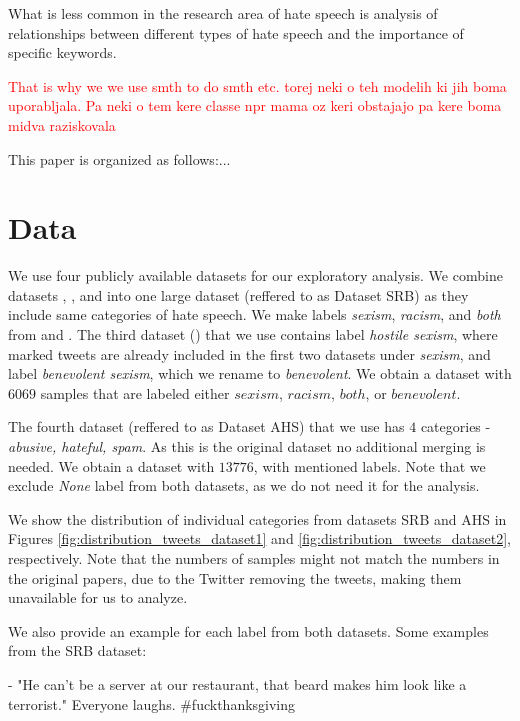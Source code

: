 \documentclass[fleqn,moreauthors,10pt]{ds_report}
\begin{document}
What is less common in the research area of hate speech is analysis of relationships between different types of hate speech and the importance of specific keywords.

\textcolor{red}{That is why we we use smth to do smth etc. torej neki o teh modelih ki jih boma uporabljala. Pa neki o tem kere classe npr mama oz keri obstajajo pa kere boma midva raziskovala}

This paper is organized as follows:...

\section*{Data}

We use four publicly available datasets for our exploratory analysis. We combine datasets \cite{waseem2016you}, \cite{rizoiu2019transfer}, and \cite{jha2017does} into one large dataset (reffered to as Dataset SRB) as they include same categories of hate speech. We make labels \textit{sexism}, \textit{racism}, and \textit{both} from \cite{waseem2016you} and \cite{rizoiu2019transfer}. The third dataset (\cite{jha2017does}) that we use contains label \textit{hostile sexism}, where marked tweets are already included in the first two datasets under \textit{sexism}, and label \textit{benevolent sexism}, which we rename to \textit{benevolent}. We obtain a dataset with $6069$ samples that are labeled either $sexism$, $racism$, $both$, or $benevolent$.

The fourth dataset (reffered to as Dataset AHS) that we use \cite{founta2018large} has $4$ categories - \textit{abusive,
hateful, spam}. As this is the original dataset no additional merging is needed. We obtain a dataset with $13776$, with mentioned labels. Note that we exclude \textit{None} label from both datasets, as we do not need it for the analysis.

We show the distribution of individual categories from datasets SRB and AHS in Figures \ref{fig:distribution_tweets_dataset1} and \ref{fig:distribution_tweets_dataset2}, respectively. Note that the numbers of samples might not match the numbers in the original papers, due to the Twitter removing the tweets, making them unavailable for us to analyze.

We also provide an example for each label from both datasets. Some examples from the SRB dataset:


\begin{tcolorbox}[width=0.9\linewidth, center,arc=8pt,sharp corners=downhill, boxrule=0.3pt]
 - "He can't be a server at our restaurant, that beard makes him look like a terrorist." Everyone laughs. \#fuckthanksgiving
\end{tcolorbox}
\end{document}
